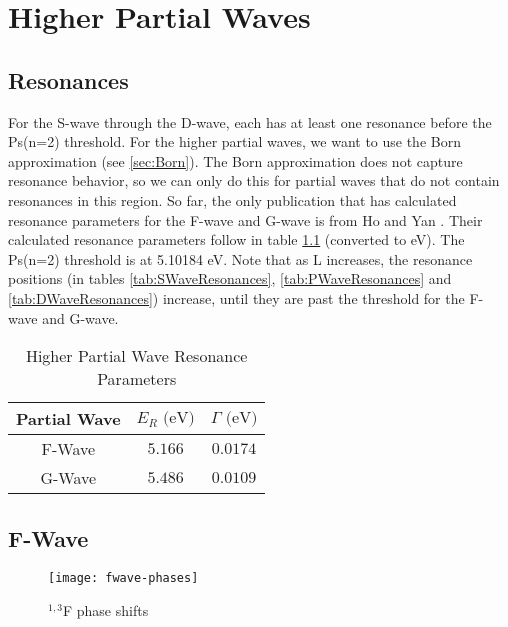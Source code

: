 \documentclass[Dissertation.tex]{subfiles}
\begin{document}
\clearpage
\pagebreak
\newpage

\chapter{Higher Partial Waves}
\label{chp:HigherWaves}


\section{Resonances}
For the S-wave through the D-wave, each has at least one resonance before the Ps(n=2) threshold. For the higher partial waves, we want to use the Born approximation (see \ref{sec:Born}). The Born approximation does not capture resonance behavior, so we can only do this for partial waves that do not contain resonances in this region. So far, the only publication that has calculated resonance parameters for the F-wave and G-wave is from Ho and Yan \cite{Ho2000}. Their calculated resonance parameters follow in table \ref{tab:HigherResonancesOther} (converted to eV). The Ps(n=2) threshold is at 5.10184 eV. Note that as L increases, the resonance positions (in tables \ref{tab:SWaveResonances}, \ref{tab:PWaveResonances} and \ref{tab:DWaveResonances}) increase, until they are past the threshold for the F-wave and G-wave. 

\setlength{\abovecaptionskip}{6pt}
\setlength{\belowcaptionskip}{6pt}
\begin{table}[H]
\centering
\begin{tabular}{c c c}
\toprule
Partial Wave & $E_R \text{ (eV)}$ & $\Gamma \text{ (eV)}$ \\
\midrule
F-Wave & $5.166$ & $0.0174$ \\
G-Wave & $5.486$ & $0.0109$ \\
\bottomrule
\end{tabular}
\caption{Higher Partial Wave Resonance Parameters} %
\label{tab:HigherResonancesOther}
\end{table}


\section{F-Wave}
\label{sec:FWave}

\begin{figure}[H]
	\centering
	\texttt{[image: fwave-phases]}
	\caption{$^{1,3}$F phase shifts}
	\label{fig:FWavePhase}
\end{figure}
\end{document}
